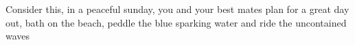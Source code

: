 Consider this, in a peaceful sunday, you and your best mates plan for a great day out, bath on the beach, peddle the blue sparking water and ride the uncontained waves